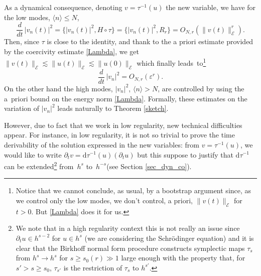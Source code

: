 \documentclass[11pt]{article}
\theoremstyle{definition}
\begin{document}
As a dynamical consequence, denoting $v=\tau^{-1}(u)$ the new variable, we have for the low modes, $\langle n \rangle \leq N$,
\[
\frac{d}{dt}\,|v_n(t)|^2=\{|v_n(t)|^2,H\circ \tau\}=\{|v_n(t)|^2,R_r\}= O_{N,r}(\|v(t)\|_{\mathcal{E}}^r).
\]
Then, since $\tau$ is close to the identity, and
thank to the a priori estimate provided by the coercivity estimate \eqref{Lambda}, we get
$\|v(t)\|_{\mathcal{E}}\lesssim\|u(t)\|_{\mathcal{E}}\lesssim \|u(0)\|_{\mathcal{E}}$ which finally leads~to\footnote{Notice that we cannot conclude, as usual, by a bootstrap argument since, as we control only the low modes, we don't control, a priori, $\|v(t)\|_{\mathcal{E}}$ for $t>0$. But \eqref{Lambda} does it for us.}
\[
\frac{d}{dt}\,|v_n|^2=O_{N,r}(\varepsilon^r).
\]
On the other hand the high modes, $|v_n|^2$, $\langle n\rangle > N$, are controlled by using the a~priori bound on the energy norm \eqref{Lambda}. Formally, these estimates on the variation of $|v_n|^2$ leads naturally to Theorem \ref{sketch}.

However, due to fact that we work in low regularity, new technical difficulties appear. For instance, in low regularity, it is not so trivial to prove the time derivability of the solution expressed in the new variables: from $v=\tau^{-1}(u)$, we would like to write $\partial_t v= \mathrm{d}\tau^{-1}(u)(\partial_t u)$ but this suppose to justify that $\mathrm{d}\tau^{-1}$ can be extended\footnote{We note that in a high regularity context this is not really an issue since $\partial_t u \in h^{s-2}$ for $u\in h^s$ (we are considering the Schrödinger equation) and it is clear that the Birkhoff normal form procedure constructs symplectic maps $\tau_s$ from $h^s\to h^s$ for $s\geq s_0(r)\gg 1$ large enough with the property that, for $s'>s\geq s_0$, $\tau_{s'}$ is the restriction of $\tau_s$ to $h^{s'}$.} from~$h^s$ to~$h^{-s}$(see Section \ref{sec_dyn_co}).
\end{document}
